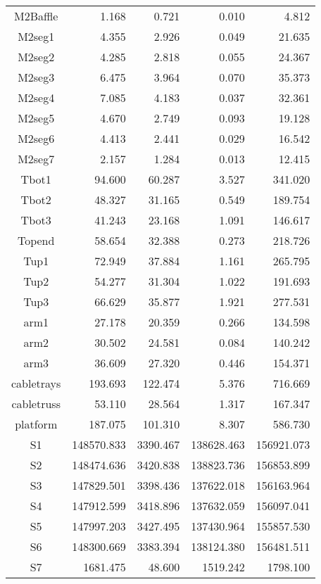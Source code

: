 \begin{longtable}{crrrr}
 M2Baffle & 1.168 & 0.721 & 0.010 & 4.812 \\
 M2seg1 & 4.355 & 2.926 & 0.049 & 21.635 \\
 M2seg2 & 4.285 & 2.818 & 0.055 & 24.367 \\
 M2seg3 & 6.475 & 3.964 & 0.070 & 35.373 \\
 M2seg4 & 7.085 & 4.183 & 0.037 & 32.361 \\
 M2seg5 & 4.670 & 2.749 & 0.093 & 19.128 \\
 M2seg6 & 4.413 & 2.441 & 0.029 & 16.542 \\
 M2seg7 & 2.157 & 1.284 & 0.013 & 12.415 \\
 Tbot1 & 94.600 & 60.287 & 3.527 & 341.020 \\
 Tbot2 & 48.327 & 31.165 & 0.549 & 189.754 \\
 Tbot3 & 41.243 & 23.168 & 1.091 & 146.617 \\
 Topend & 58.654 & 32.388 & 0.273 & 218.726 \\
 Tup1 & 72.949 & 37.884 & 1.161 & 265.795 \\
 Tup2 & 54.277 & 31.304 & 1.022 & 191.693 \\
 Tup3 & 66.629 & 35.877 & 1.921 & 277.531 \\
 arm1 & 27.178 & 20.359 & 0.266 & 134.598 \\
 arm2 & 30.502 & 24.581 & 0.084 & 140.242 \\
 arm3 & 36.609 & 27.320 & 0.446 & 154.371 \\
 cabletrays & 193.693 & 122.474 & 5.376 & 716.669 \\
 cabletruss & 53.110 & 28.564 & 1.317 & 167.347 \\
 platform & 187.075 & 101.310 & 8.307 & 586.730 \\
 S1 & 148570.833 & 3390.467 & 138628.463 & 156921.073 \\
 S2 & 148474.636 & 3420.838 & 138823.736 & 156853.899 \\
 S3 & 147829.501 & 3398.436 & 137622.018 & 156163.964 \\
 S4 & 147912.599 & 3418.896 & 137632.059 & 156097.041 \\
 S5 & 147997.203 & 3427.495 & 137430.964 & 155857.530 \\
 S6 & 148300.669 & 3383.394 & 138124.380 & 156481.511 \\
 S7 & 1681.475 & 48.600 & 1519.242 & 1798.100 \\
\bottomrule
\end{longtable}




